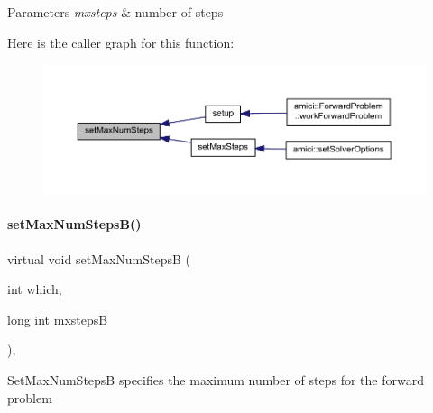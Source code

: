 \begin{DoxyParams}{Parameters}
{\em mxsteps} & number of steps \\
\hline
\end{DoxyParams}
Here is the caller graph for this function\+:
\nopagebreak
\begin{figure}[H]
\begin{center}
\leavevmode
\includegraphics[width=350pt]{classamici_1_1_solver_a29f208ce304b01c8fe294ab9143a98e5_icgraph}
\end{center}
\end{figure}
\mbox{\label{classamici_1_1_solver_a1163fddb222195354bdcf306fc52a1d0}} 
\paragraph{\texorpdfstring{set\+Max\+Num\+Steps\+B()}{setMaxNumStepsB()}}
{\footnotesize\ttfamily virtual void set\+Max\+Num\+StepsB (\begin{DoxyParamCaption}\item[{int}]{which,  }\item[{long int}]{mxstepsB }\end{DoxyParamCaption})\hspace{0.3cm}{\ttfamily [protected]}, {}}

Set\+Max\+Num\+StepsB specifies the maximum number of steps for the forward problem


